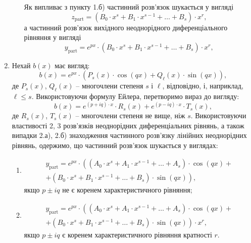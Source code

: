 \begin{enumerate}
\begin{enumerate}
		Як випливає з пункту 1.б) частинний розв’язок шукається у вигляді
		\begin{equation*}
			z_{\text{part}} = \left( B_0 \cdot x^s + B_1 \cdot x^{s - 1} + \ldots + B_s \right) \cdot x^r,
		\end{equation*}
		а частинний розв’язок вихідного неоднорідного диференціального рівняння у вигляді
		\begin{equation*}
			y_{\text{part}} = e^{p x} \cdot \left( B_0 \cdot x^s + B_1 \cdot x^{s - 1} + \ldots + B_s \right) \cdot x^r,
		\end{equation*}
 	\end{enumerate}
	\item Нехай $b(x)$ має вигляд:
	\begin{equation*}
		b(x) = e^{px} \cdot \left( P_s(x) \cdot \cos (qx) + Q_\ell (x) \cdot \sin(q x) \right),
	\end{equation*}
	де $P_s(x)$, $Q_\ell(x)$ -- многочлени степеня $s$ і $\ell$, відповідно, і, наприклад, $\ell \le s$. Використовуючи формулу Ейлера, перетворимо вираз до вигляду:
	\begin{equation*}
		b(x) = e^{(p + i q) \cdot x} \cdot R_s(x) + e^{(p - i q) \cdot x} \cdot T_s(x),
	\end{equation*}
	де $R_s(x)$, $T_s(x)$ -- многочлени степеня не вище, ніж $s$. Використовуючи властивості 2, 3 розв’язків неоднорідних диференціальних рівнянь, а також випадки 2.а), 2.б) знаходження частинного розв’язку лінійних неоднорідних рівнянь, одержимо, що частинний розв’язок шукається у виглядах:
 	\begin{enumerate}
 		\item 
 		\begin{multline*}
 			y_{\text{part}} = e^{p x} \cdot \left( \left( A_0 \cdot x^s + A_1 \cdot x^{s - 1} + \ldots + A_s \right) \cdot \cos (qx) \right. + \\ + \left. \left( B_0 \cdot x^s + B_1 \cdot x^{s - 1} + \ldots + B_s \right) \cdot \sin (q x) \right),
 		\end{multline*}
		якщо $p \pm i q$ не є коренем характеристичного рівняння;
		\item
		\begin{multline*}
 			y_{\text{part}} = e^{p x} \cdot \left( \left( A_0 \cdot x^s + A_1 \cdot x^{s - 1} + \ldots + A_s \right) \cdot \cos (qx) \right. + \\ + \left. \left( B_0 \cdot x^s + B_1 \cdot x^{s - 1} + \ldots + B_s \right) \cdot \sin (q x) \right) \cdot x^r,
 		\end{multline*}
 		якщо $p \pm i q$ є коренем характеристичного рівняння кратності $r$.
 	\end{enumerate}
\end{enumerate}